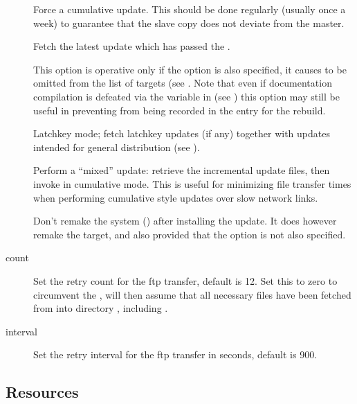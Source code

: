 \begin{description}
\item[]
   Force a cumulative update.  This should be done regularly (usually once a
   week) to guarantee that the slave copy does not deviate from the master.

\item[]
   Fetch the latest update which has passed the .

\item[]
   This option is operative only if the  option is also specified, it
   causes  to be omitted from the list of targets (see
   .  Note that even if documentation compilation is
   defeated via the  variable in  (see
   ) this option may still be useful in preventing
    from being recorded in the  entry for the
   rebuild.

\item[]
   Latchkey mode; fetch latchkey updates (if any) together with updates
   intended for general distribution (see ).

\item[]
   Perform a ``mixed'' update: retrieve the incremental update files,
   then invoke  in cumulative mode.  This is useful for
   minimizing file transfer times when performing cumulative style
   updates over slow network links.

\item[]
   Don't remake the system () after installing the update.  It
   does however remake the  target, and also 
   provided that the  option is not also specified.

\item[ count]
   Set the retry count for the ftp transfer, default is 12.  Set this to zero
   to circumvent the ,  will then assume that all
   necessary files have been fetched from  into directory
   , including .

\item[ interval]
   Set the retry interval for the ftp transfer in seconds, default is 900.
\end{description}

\subsection*{Resources}

